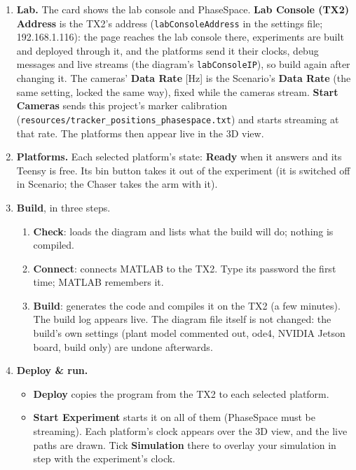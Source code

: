 \documentclass[11pt,a4paper]{article}
\newcommand{\ui}[1]{\textsf{\textbf{#1}}}
\newcommand{\pth}[1]{\texttt{#1}}
\begin{document}
\begin{enumerate}
  \item \textbf{Lab.} The card shows the lab console and PhaseSpace. \ui{Lab Console (TX2) Address} is the TX2's
        address (\texttt{labConsoleAddress} in the settings file; 192.168.1.116): the page reaches the lab console there,
        experiments are built and deployed through it, and the platforms send it their clocks, debug messages and live
        streams (the diagram's \texttt{labConsoleIP}), so build again after changing it. The cameras' \ui{Data Rate}
        [Hz] is the Scenario's \ui{Data Rate} (the same setting, locked the same way), fixed while the cameras stream.
        \ui{Start Cameras} sends this project's marker calibration (\pth{resources/tracker\_positions\_phasespace.txt})
        and starts streaming at that rate. The platforms then appear live in the 3D view.
  \item \textbf{Platforms.} Each selected platform's state: \ui{Ready} when it answers and its Teensy is free.
        Its bin button takes it out of the experiment (it is switched off in Scenario; the Chaser takes the arm with it).
  \item \textbf{Build}, in three steps.
        \begin{enumerate}
          \item \ui{Check}: loads the diagram and lists what the build will do; nothing is compiled.
          \item \ui{Connect}: connects MATLAB to the TX2. Type its password the first time; MATLAB remembers it.
          \item \ui{Build}: generates the code and compiles it on the TX2 (a few minutes). The build log appears live.
                The diagram file itself is not changed: the build's own settings (plant model commented out, ode4,
                NVIDIA Jetson board, build only) are undone afterwards.
        \end{enumerate}
  \item \textbf{Deploy \& run.}
        \begin{itemize}
          \item \ui{Deploy} copies the program from the TX2 to each selected platform.
          \item \ui{Start Experiment} starts it on all of them (PhaseSpace must be streaming). Each platform's clock
                appears over the 3D view, and the live paths are drawn. Tick \ui{Simulation} there to overlay your
                simulation in step with the experiment's clock.

\end{itemize}
\end{enumerate}
\end{document}
